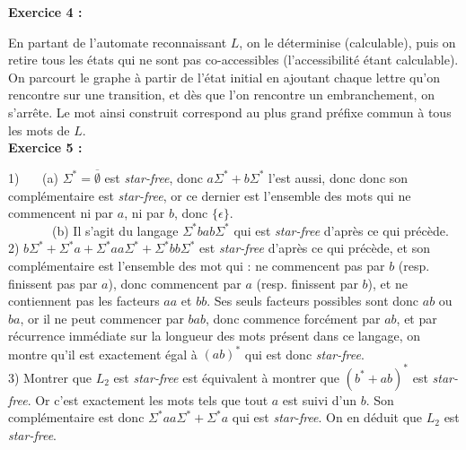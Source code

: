 \documentclass[10pt,a4paper]{article}
\begin{document}
\textbf{Exercice 4 : \\} 

En partant de l'automate reconnaissant $L$, on le déterminise (calculable), puis on retire tous les états qui ne sont pas co-accessibles (l'accessibilité étant calculable). On parcourt le graphe à partir de l'état initial en ajoutant chaque lettre qu'on rencontre sur une transition, et dès que l'on rencontre un embranchement, on s'arrête. Le mot ainsi construit correspond au plus grand préfixe commun à tous les mots de $L$.\\

\textbf{Exercice 5 : \\}

1) \ \ \ (a) $\Sigma^*= \overline{\emptyset} $ est \textit{star-free}, donc $a\Sigma^* + b\Sigma^*$ l'est aussi, donc donc son complémentaire est \textit{star-free}, or ce dernier est l'ensemble des mots qui ne commencent ni par $a$, ni par $b$, donc $\{\epsilon\}$. \\

\ \ \ \ \ \ \ (b) Il s'agit du langage $\Sigma^*bab\Sigma^*$ qui est \textit{star-free} d'après ce qui précède. \\

2) $b\Sigma^* + \Sigma^*a + \Sigma^*aa\Sigma^* + \Sigma^*bb\Sigma^*$ est \textit{star-free} d'après ce qui précède, et son complémentaire est l'ensemble des mot qui : ne commencent pas par $b$ (resp. finissent pas par $a$), donc commencent par $a$ (resp. finissent par $b$), et ne contiennent pas les facteurs $aa$ et $bb$. Ses seuls facteurs possibles sont donc $ab$ ou $ba$, or il ne peut commencer par $bab$, donc commence forcément par $ab$, et par récurrence immédiate sur la longueur des mots présent dans ce langage, on montre qu'il est exactement égal à $(ab)^*$ qui est donc \textit{star-free}. \\

3) Montrer que $L_2$ est \textit{star-free} est équivalent à montrer que $(b^* + ab)^*$ est \textit{star-free}. Or c'est exactement les mots tels que tout $a$ est suivi d'un $b$. Son complémentaire est donc $ \Sigma^*aa\Sigma^* + \Sigma^*a $ qui est \textit{star-free}. On en déduit que $L_2$ est \textit{star-free}.
\end{document}
